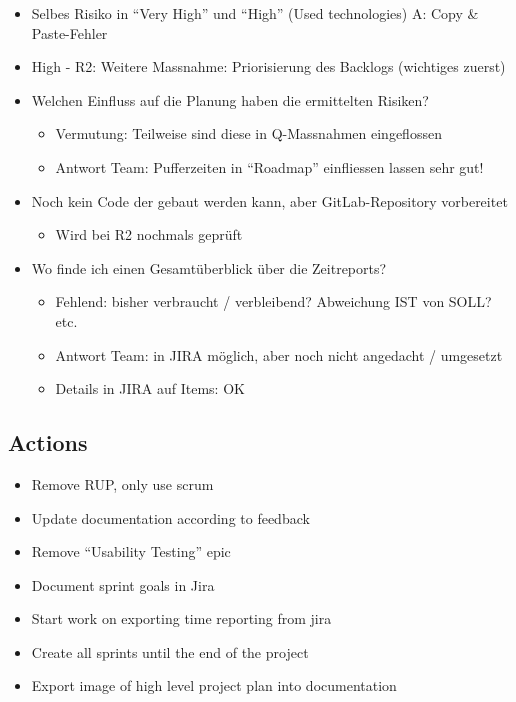 \begin{itemize}
\begin{itemize}
    \end{itemize}
    \item Selbes Risiko in ``Very High'' und ``High'' (Used technologies) \textrightarrow A: Copy \& Paste-Fehler
    \item High - R2: Weitere Massnahme: Priorisierung des Backlogs (wichtiges zuerst)
    \item Welchen Einfluss auf die Planung haben die ermittelten Risiken?
    \begin{itemize}
        \item Vermutung: Teilweise sind diese in Q-Massnahmen eingeflossen
        \item Antwort Team: Pufferzeiten in ``Roadmap'' einfliessen lassen \textrightarrow sehr gut!
    \end{itemize}
    \item Noch kein Code der gebaut werden kann, aber GitLab-Repository vorbereitet
    \begin{itemize}
        \item Wird bei R2 nochmals geprüft
    \end{itemize}
    \item Wo finde ich einen Gesamtüberblick über die Zeitreports?
    \begin{itemize}
        \item Fehlend: bisher verbraucht / verbleibend?
        Abweichung IST von SOLL? etc.
        \item Antwort Team: in JIRA möglich, aber noch nicht angedacht / umgesetzt
        \item Details in JIRA auf Items: OK
    \end{itemize}
\end{itemize}

\subsection{Actions}

\begin{itemize}
    \item Remove RUP, only use scrum
    \item Update documentation according to feedback
    \item Remove ``Usability Testing'' epic
    \item Document sprint goals in Jira
    \item Start work on exporting time reporting from jira
    \item Create all sprints until the end of the project
    \item Export image of high level project plan into documentation
\end{itemize}



